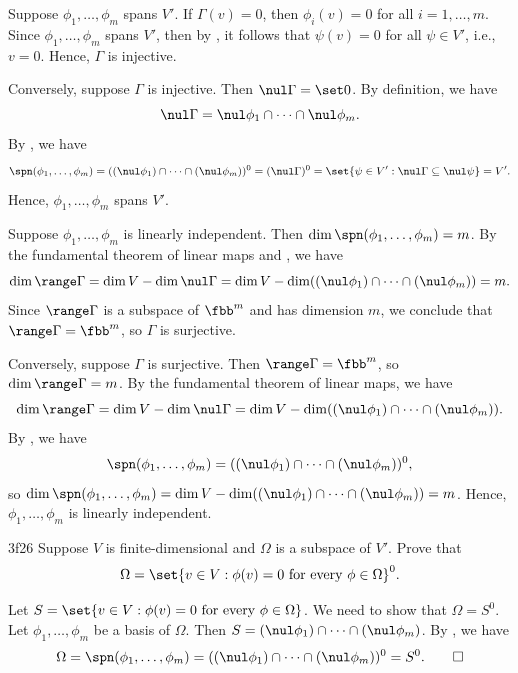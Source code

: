 \begin{solenum}
    \item Suppose $\phi_1, \ldots, \phi_m$ spans $V'$.
	If $\Gamma(v) = 0$, then $\phi_i(v) = 0$ for all $i = 1, \ldots, m$.
	Since $\phi_1, \ldots, \phi_m$ spans $V'$, then by , it follows that $\psi(v) = 0$ for all $\psi \in V'$, i.e., $v = 0$.
	Hence, $\Gamma$ is injective.
    
    Conversely, suppose $\Gamma$ is injective.
	Then $\nul \Gamma = \set 0$.
	By definition, we have
    \[
    	\nul \Gamma = \nul \phi_1 \cap \cdots \cap \nul \phi_m.
    \]
    By , we have
    \[
    	\spn(\phi_1, \ldots, \phi_m) = ((\nul \phi_1) \cap \cdots \cap (\nul \phi_m))^0 = (\nul \Gamma)^0 = \set{\psi \in V' : \nul \Gamma \subseteq \nul \psi} = V'.
    \]
    Hence, $\phi_1, \ldots, \phi_m$ spans $V'$.
    \item Suppose $\phi_1, \ldots, \phi_m$ is linearly independent.
	Then $\dim \spn(\phi_1, \ldots, \phi_m) = m$.
	By the fundamental theorem of linear maps and , we have
    \[
    	\dim \range \Gamma = \dim V - \dim \nul \Gamma = \dim V - \dim((\nul \phi_1) \cap \cdots \cap (\nul \phi_m)) = m.
    \]
    Since $\range \Gamma$ is a subspace of $\fbb^m$ and has dimension $m$, we conclude that $\range \Gamma = \fbb^m$, so $\Gamma$ is surjective.

    Conversely, suppose $\Gamma$ is surjective.
	Then $\range \Gamma = \fbb^m$, so $\dim \range \Gamma = m$.
	By the fundamental theorem of linear maps, we have
    \[
    	\dim \range \Gamma = \dim V - \dim \nul \Gamma = \dim V - \dim((\nul \phi_1) \cap \cdots \cap (\nul \phi_m)).
    \]
    By , we have
    \[
    	\spn(\phi_1, \ldots, \phi_m) = ((\nul \phi_1) \cap \cdots \cap (\nul \phi_m))^0,
    \]
    so $\dim \spn(\phi_1, \ldots, \phi_m) = \dim V - \dim((\nul \phi_1) \cap \cdots \cap (\nul \phi_m)) = m$.
	Hence, $\phi_1, \ldots, \phi_m$ is linearly independent.
\end{solenum}

\begin{exercise}{3f26}
    Suppose $V$ is finite-dimensional and $\Omega$ is a subspace of $V'$.
	Prove that
    \[
    	\Omega = \set{v \in V : \phi(v) = 0 \text{ for every } \phi \in \Omega}^0.
    \]
\end{exercise}

\begin{sol}
    Let $S = \set{v \in V : \phi(v) = 0 \text{ for every } \phi \in \Omega}$.
	We need to show that $\Omega = S^0$.
	Let $\phi_1, \ldots, \phi_m$ be a basis of $\Omega$.
	Then $S = (\nul \phi_1) \cap \cdots \cap (\nul \phi_m)$.
	By , we have
    \[
    	\Omega = \spn(\phi_1, \ldots, \phi_m) = ((\nul \phi_1) \cap \cdots \cap (\nul \phi_m))^0 = S^0. \qedhere
    \]
\end{sol}

